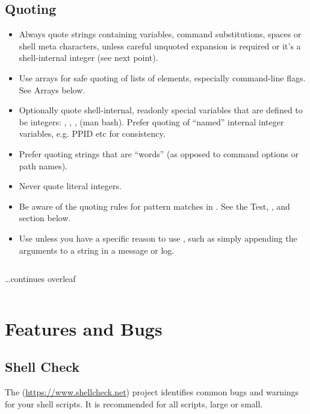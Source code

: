 \documentclass{article}
\begin{document}
\subsection{Quoting}
\label{subsec:quot}
\begin{itemize}
    \item Always quote strings containing variables, command substitutions, spaces or shell meta characters, unless careful unquoted expansion is required or it’s a shell-internal integer (see next point).
    \item Use arrays for safe quoting of lists of elements, especially command-line flags. See Arrays below.
    \item Optionally quote shell-internal, readonly special variables that are defined to be integers: , \code{\$\#}, \code{\$\$}, \code{\$!} (man bash). Prefer quoting of “named” internal integer variables, e.g. PPID etc for consistency.
    \item Prefer quoting strings that are “words” (as opposed to command options or path names).
    \item Never quote literal integers.
    \item Be aware of the quoting rules for pattern matches in \code{[[ … ]]}. See the Test, \code{[ … ]}, and \code{[[ … ]]} section below.
    \item Use  unless you have a specific reason to use \code{\$*}, such as simply appending the arguments to a string in a message or log.
\end{itemize}
\inputminted[frame=single,firstline=148, lastline=169,linenos]{bash}{./styleguide.bash}

\begin{center}
\vspace{1em}
\ldots continues overleaf    
\end{center}
\newpage
\inputminted[frame=single,firstline=171, lastline=212,linenos]{bash}{./styleguide.bash}

\section{Features and Bugs}
\label{sec:feat_bugs}

\subsection{Shell Check}
\label{subsec:shell_check}
The (\url{https://www.shellcheck.net}) project identifies common bugs and warnings for your shell scripts. It is recommended for all scripts, large or small.
\end{document}
